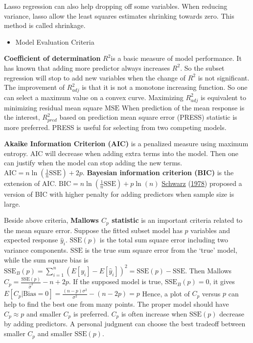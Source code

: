 \documentclass[
  11pt,
  openany]{memoir}
\providecommand{\tightlist}{%
  \setlength{\itemsep}{0pt}\setlength{\parskip}{0pt}}
\begin{document}
Lasso regression can also help dropping off some variables.
When reducing variance, lasso allow the least squares estimates shrinking towards zero. This method is called shrinkage.

\begin{itemize}
\tightlist
\item
  Model Evaluation Criteria
\end{itemize}

\textbf{Coefficient of determination} \(R^2\)is a basic measure of model performance. It has known that adding more predictor always increases \(R^2\). So the subset regression will stop to add new variables when the change of \(R^2\) is not significant.
The improvement of \(R^2_{adj}\) is that it is not a monotone increasing function. So one can select a maximum value on a convex curve.
Maximizing \(R^2_{adj}\) is equivalent to minimizing residual mean square \(\mathrm{MSE}\)
When prediction of the mean response is the interest, \(R^2_{pred}\) based on prediction mean square error (PRESS) statistic is more preferred. PRESS is useful for selecting from two competing models.

\textbf{Akaike Information Criterion (AIC)} is a penalized measure using maximum entropy.
AIC will decrease when adding extra terms into the model. Then one can justify when the model can stop adding the new terms. \(\mathrm{AIC}=n\ln\left(\frac1n \mathrm{SSE} \right)+ 2p\).
\textbf{Bayesian information criterion (BIC)} is the extension of AIC. \(\mathrm{BIC}=n\ln\left(\frac{1}{n} \mathrm{SSE} \right)+ p\ln(n)\) \protect\hyperlink{ref-schwarzEstimatingDimensionModel1978}{Schwarz} (\protect\hyperlink{ref-schwarzEstimatingDimensionModel1978}{1978}) proposed a version of BIC with higher penalty for adding predictors when sample size is large.

Beside above criteria, \textbf{Mallows \(C_p\) statistic} is an important criteria related to the mean square error.
Suppose the fitted subset model has \(p\) variables and expected response \(\hat y_i\). \(\mathrm{SSE}(p)\) is the total sum square error including two variance components.
\(\mathrm{SSE}\) is the true sum square error from the `true' model, while the sum square bias is \(\mathrm{SSE}_B(p)=\sum_{i=1}^n(E[y_i]-E[\hat y_i])^2= \mathrm{SSE}(p) - \mathrm{SSE}\).
Then Mallows \(C_p=\frac{\mathrm{SSE}(p)}{\hat\sigma^2} - n + 2p\).
If the supposed model is true, \(\mathrm{SSE}_B(p)=0\), it gives \(E[C_p|\mathrm{Bias}=0] = \frac{(n-p)\sigma^2}{\sigma^2}-(n-2p)=p\)
Hence, a plot of \(C_p\) versus \(p\) can help to find the best one from many points. The proper model should have \(C_p\approx p\) and smaller \(C_p\) is preferred.
\(C_p\) is often increase when \(\mathrm{SSE}(p)\) decrease by adding predictors. A personal judgment can choose the best tradeoff between smaller \(C_p\) and smaller \(\mathrm{SSE}(p)\).
\end{document}
